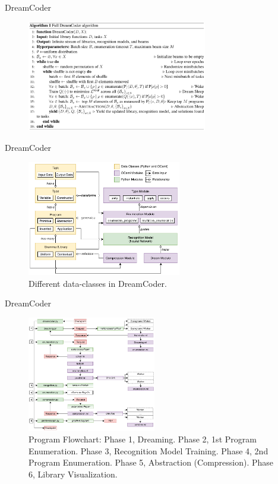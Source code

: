 \documentclass[AERbeamer%
              ,optEnglish%
              ,optBiber%
              ,optBibstyleAlphabetic%
              ,optBeamerClassicFormat%
              ]{AERlatex}%
\begin{document}
\begin{frame}[c]{DreamCoder}
    \centering
    \begin{figure}
        \centering
        \includegraphics[width=0.7\textwidth]{DreamCoderAlgo.png}
    \end{figure}
\end{frame}


\begin{frame}[c]{DreamCoder}
    \centering
    \begin{figure}
        \centering
        \includegraphics[width=0.6\textwidth]{DreamCoderDataClasses.png}
        \caption{Different data-classes in DreamCoder.}
    \end{figure}
\end{frame}


\begin{frame}[c]{DreamCoder}
    \centering
    \begin{figure}
        \centering
        \includegraphics[width=0.5\textwidth]{DreamCoderProgramFlowchart.png}
        \caption{Program Flowchart: Phase 1, Dreaming. Phase 2, 1st Program Enumeration. Phase 3, Recognition Model Training.
                 Phase 4, 2nd Program Enumeration. Phase 5, Abstraction (Compression). Phase 6, Library Visualization.}
    \end{figure}
\end{frame}
\end{document}
